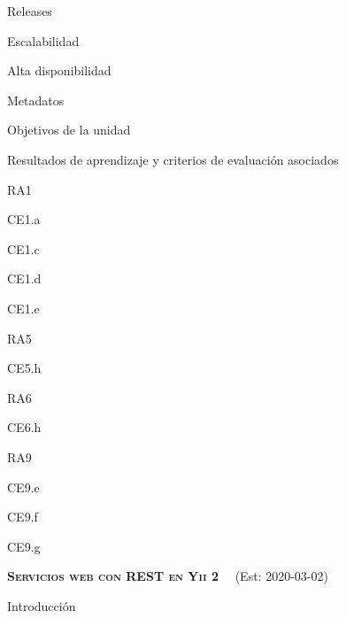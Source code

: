 \begin{longenum}
\begin{longenum}
\begin{longenum}
            \item Releases
        \end{longenum}
        \item Escalabilidad \opcional\
        \item Alta disponibilidad \opcional\
        \item Metadatos
        \begin{longenum}
            \item Objetivos de la unidad
            \item Resultados de aprendizaje y criterios de evaluación asociados
            \begin{longenum}
                \item RA1
                \begin{longenum}
                    \item CE1.a
                    \item CE1.c
                    \item CE1.d
                    \item CE1.e
                \end{longenum}
                \item RA5
                \begin{longenum}
                    \item CE5.h
                \end{longenum}
                \item RA6
                \begin{longenum}
                    \item CE6.h
                \end{longenum}
                \item RA9
                \begin{longenum}
                    \item CE9.e
                    \item CE9.f
                    \item CE9.g
                \end{longenum}
            \end{longenum}
        \end{longenum}
    \end{longenum}
    \item \textbf{\textsc{Servicios web con REST en Yii 2}} \ \opcional\ (Est: 2020-03-02)
    \begin{longenum}
        \item Introducción

\end{longenum}
\end{longenum}
